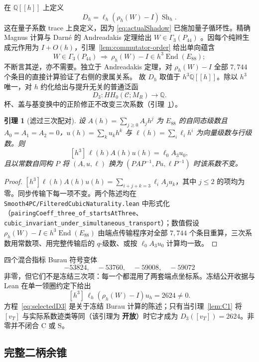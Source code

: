 \documentclass[11pt]{amsart}
\newtheorem{lemma}[theorem]{引理}
\theoremstyle{definition}
\theoremstyle{remark}
\newcommand{\Q}{\mathbb{Q}}
\newcommand{\Open}{\textbf{开放}}
\begin{document}
在 $\Q[[h]]$ 上定义
\[
D_h=\ell_h(\rho_h(W)-I)\operatorname{Sh}_h.
\]
这在量子系数 trace 上良定义，因为 \eqref{eq:actualShadow} 已施加量子循环性。精确 Magnus 计算与 Darn\'e 的 Andreadakis 定理给出 $W\in\Gamma_3(P_{44})$ \cite[Theorem~6.2]{Darne2021}。因每个纯辫生成元作用为 $I+O(h)$，引理~\ref{lem:commutator-order} 给出单向蕴含
\[
W\in\Gamma_3(P_{44})\ \Longrightarrow\
\rho_h(W)-I\in h^3\operatorname{End}(E_{88});
\]
不断言其逆，亦不需要。独立于 Andreadakis 定理，对 $\rho_h(W)-I$ 全部 $7{,}744$ 个条目的直接计算验证了右侧的隶属关系。
故 $D_h$ 取值于 $h^3\Q[[h]]$。除以 $h^3$ 唯一，对 $h$ 约化给出与提升无关的普通泛函
\[
D_3:HH_0(\mathcal C;M_R)\longrightarrow\Q.
\]
杯、盖与基变换中的正阶修正不改变三次系数（引理~\ref{lem:filtered-cubic}）。

\begin{lemma}[滤过三次配对]\label{lem:filtered-cubic}
设 $A(h)=\sum_{j\ge0}A_jh^j$ 为 $E_{88}$ 的自同态级数且 $A_0=A_1=A_2=0$，$u(h)=\sum_k u_kh^k$ 与 $\ell(h)=\sum_i\ell_ih^i$ 为向量级数与行级数。则
\[
[h^3]\,\ell(h)A(h)u(h)=\ell_0A_3u_0,
\]
且以常数自同构 $P$ 将 $(A,u,\ell)$ 换为 $(PAP^{-1},Pu,\ell P^{-1})$ 时该系数不变。
\end{lemma}

\begin{proof}
$[h^3]\ell(h)A(h)u(h)=\sum_{i+j+k=3}\ell_iA_ju_k$，其中 $j\le2$ 的项均为零。同步传输下每一项不变。两个陈述均在 \texttt{Smooth4PC/FilteredCubicNaturality.lean} 中形式化（\texttt{pairingCoeff\_three\_of\_startsAtThree}、\texttt{cubic\_invariant\_under\_simultaneous\_transport}）；数值假设 $\rho_h(W)-I\in h^3\operatorname{End}(E_{88})$ 由端点传输程序对全部 $7{,}744$ 个条目重算，三次系数用常数项、用完整传输后的 $q$-级数、或按 $\ell_0A_3u_0$ 计算均一致。
\end{proof}

四个混合指标 Burau 符号变体
\[
-53824,\quad -53760,\quad -59008,\quad -59072
\]
非零，但它们不是冻结三次项：每一个都混用了两套端点坐标系。冻结公开收据与 Lean 在单一领圈约定下给出
\begin{equation}\label{eq:selectedD3}
[h^3]\,\ell_h(\rho_h(W)-I)u_h=2624\ne0.
\end{equation}
方程~\eqref{eq:selectedD3} 是关于冻结 Burau 计算的陈述；只有当引理~\ref{lem:C1} 将 $[v_T]$ 与实际系数迹类等同（该引理为 \Open）时它才成为 $D_3([v_T])=2624$。非零并不闭合 C 或 S。

\subsection{完整二柄余锥}
\end{document}
